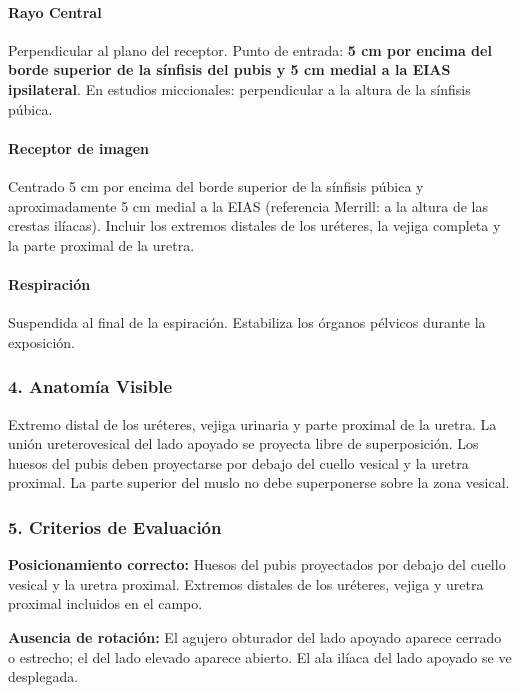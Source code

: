 	\paragraph{Rayo Central}
	Perpendicular al plano del receptor. Punto de entrada: \textbf{5 cm por encima del borde superior de la sínfisis del pubis y 5 cm medial a la EIAS ipsilateral}. En estudios miccionales: perpendicular a la altura de la sínfisis púbica.
	
	\paragraph{Receptor de imagen}
	Centrado 5 cm por encima del borde superior de la sínfisis púbica y aproximadamente 5 cm medial a la EIAS (referencia Merrill: a la altura de las crestas ilíacas). Incluir los extremos distales de los uréteres, la vejiga completa y la parte proximal de la uretra.
	
	\paragraph{Respiración}
	Suspendida al final de la espiración. Estabiliza los órganos pélvicos durante la exposición.
	
	\subsubsection*{4. Anatomía Visible}
	
	Extremo distal de los uréteres, vejiga urinaria y parte proximal de la uretra. La unión ureterovesical del lado apoyado se proyecta libre de superposición. Los huesos del pubis deben proyectarse por debajo del cuello vesical y la uretra proximal. La parte superior del muslo no debe superponerse sobre la zona vesical.
	
	\subsubsection*{5. Criterios de Evaluación}
	
	\textbf{Posicionamiento correcto:} Huesos del pubis proyectados por debajo del cuello vesical y la uretra proximal. Extremos distales de los uréteres, vejiga y uretra proximal incluidos en el campo.
	
	\textbf{Ausencia de rotación:} El agujero obturador del lado apoyado aparece cerrado o estrecho; el del lado elevado aparece abierto. El ala ilíaca del lado apoyado se ve desplegada.
	

